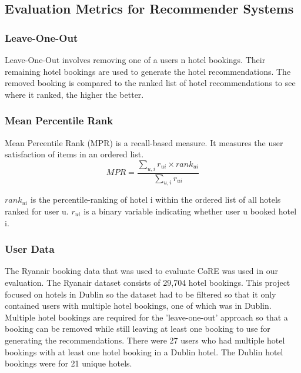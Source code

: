 \subsection{Evaluation Metrics for Recommender Systems}
\subsubsection{Leave-One-Out}
Leave-One-Out involves removing one of a users n hotel bookings. Their remaining hotel bookings are used to generate the hotel recommendations. The removed booking is compared to the ranked list of hotel recommendations to see where it ranked, the higher the better. 

\subsubsection{Mean Percentile Rank}
Mean Percentile Rank (MPR) is a recall-based measure. It measures the user satisfaction of items in an ordered list.
\begin{equation}
    MPR = \frac{ \sum_{u,i} r_{ui} \times rank_{ui} } {\sum_{u,i} r_{ui}}
\end{equation}

$rank_{ui}$ is the percentile-ranking of hotel i within the ordered list of all hotels ranked for user u. $r_{ui}$ is a binary variable indicating whether user u booked hotel i.

\subsubsection{User Data}
The Ryanair booking data that was used to evaluate CoRE \cite{core2019} was used in our evaluation. The Ryanair dataset consists of 29,704 hotel bookings. This project focused on hotels in Dublin so the dataset had to be filtered so that it only contained users with multiple hotel bookings, one of which was in Dublin. Multiple hotel bookings are required for the 'leave-one-out' approach so that a booking can be removed while still leaving at least one booking to use for generating the recommendations. There were 27 users who had multiple hotel bookings with at least one hotel booking in a Dublin hotel. The Dublin hotel bookings were for 21 unique hotels. 

